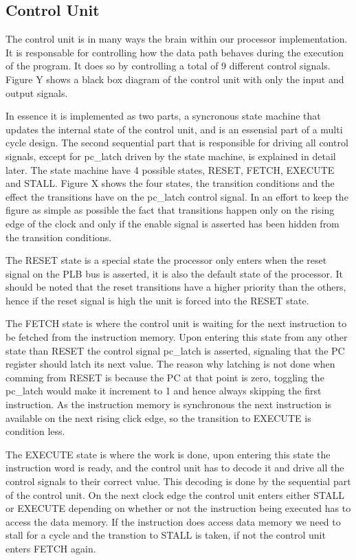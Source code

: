 \subsection*{Control Unit}

The control unit is in many ways the brain within our processor implementation. It is responsable for controlling how the data path behaves during the execution of the program. It does so by controlling a total of 9 different control signals. Figure Y shows a black box diagram of the control unit with only the input and output signals.

In essence it is implemented as two parts, a syncronous state machine that updates the internal state of the control unit, and is an essensial part of a multi cycle design. The second sequential part that is responsible for driving all control signals, except for pc\_latch driven by the state machine, is explained in detail later. The state machine have 4 possible states, RESET, FETCH, EXECUTE and STALL. Figure X shows the four states, the transition conditions and the effect the transitions have on the pc\_latch control signal. In an effort to keep the figure as simple as possible the fact that transitions happen only on the rising edge of the clock and only if the enable signal is asserted has been hidden from the transition conditions.

The RESET state is a special state the processor only enters when the reset signal on the PLB bus is asserted, it is also the default state of the processor. It should be noted that the reset transitions have a higher priority than the others, hence if the reset signal is high the unit is forced into the RESET state.

The FETCH state is where the control unit is waiting for the next instruction to be fetched from the instruction memory. Upon entering this state from any other state than RESET the control signal pc\_latch is asserted, signaling that the PC register should latch its next value. The reason why latching is not done when comming from RESET is because the PC at that point is zero, toggling the pc\_latch would make it increment to 1 and hence always skipping the first instruction. As the instruction memory is synchronous the next instruction is available on the next rising click edge, so the transition to EXECUTE is condition less.

The EXECUTE state is where the work is done, upon entering this state the instruction word is ready, and the control unit has to decode it and drive all the control signals to their correct value. This decoding is done by the sequential part of the control unit. On the next clock edge the control unit enters either STALL or EXECUTE depending on whether or not the instruction being executed has to access the data memory. If the instruction does access data memory we need to stall for a cycle and the transtion to STALL is taken, if not the control unit enters FETCH again.

